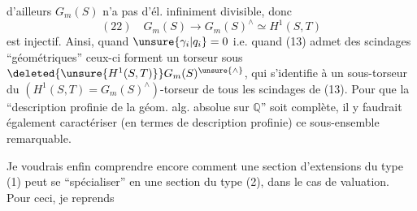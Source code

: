 d'ailleurs $G_m(S)$ n'a pas d'él. infiniment divisible, donc
\[
(22)\quad G_m(S)\longrightarrow G_m(S)^\wedge\simeq H^1(S,T)
\]
est injectif. Ainsi, quand $\unsure{\gamma_i|q_i}=0$ i.e. quand (13) admet des scindages ``géométriques''  ceux-ci forment un torseur sous $\deleted{\unsure{H^1(S,T)}}G_m(S)^{\unsure{\wedge}}$, qui s'identifie à un sous-torseur du $(H^1(S,T)=G_m(S)^\wedge)$-torseur de tous les scindages de (13). Pour que la ``description profinie de la géom. alg. absolue sur $\mathbb Q$'' soit complète, il y faudrait également caractériser (en termes de  description profinie) ce sous-ensemble remarquable.

Je voudrais enfin comprendre encore comment une section d'extensions du type (1) peut se ``spécialiser'' en une section du type (2), dans le cas de  valuation. Pour ceci, je reprends
